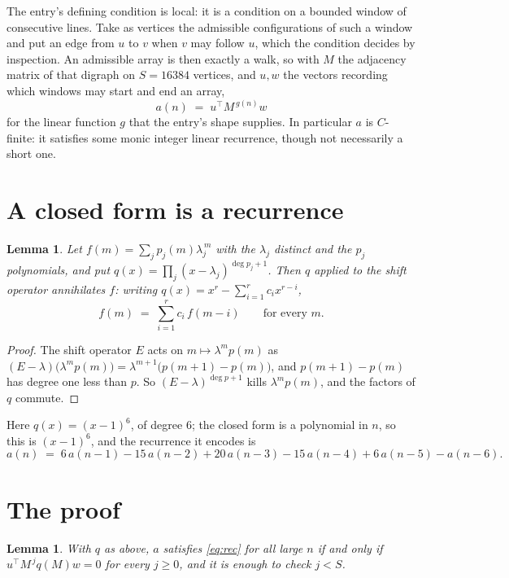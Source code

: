 \documentclass[11pt,a4paper]{article}
\theoremstyle{plain}
\newtheorem{lemma}[theorem]{Lemma}
\theoremstyle{definition}
\begin{document}
The entry's defining condition is local: it is a condition on a bounded window of consecutive lines. Take as vertices the
admissible configurations of such a window and put an edge from $u$ to $v$ when $v$ may
follow $u$, which the condition decides by inspection. An admissible array is then exactly a
walk, so with $M$ the adjacency matrix of that digraph on $S=16384$ vertices, and $u,w$ the
vectors recording which windows may start and end an array,
\[
a(n)\;=\;u^{\!\top}M^{\,g(n)}w
\]
for the linear function $g$ that the entry's shape supplies. In particular $a$ is
$C$-finite: it satisfies some monic integer linear recurrence, though not necessarily a short
one.

\section{A closed form is a recurrence}

\begin{lemma}\label{lem:ann}
Let $f(m)=\sum_{j}p_j(m)\lambda_j^{\,m}$ with the $\lambda_j$ distinct and the $p_j$
polynomials, and put $q(x)=\prod_j(x-\lambda_j)^{\deg p_j+1}$. Then $q$ applied to the shift
operator annihilates $f$: writing $q(x)=x^{r}-\sum_{i=1}^{r}c_ix^{r-i}$,
\[
f(m)\;=\;\sum_{i=1}^{r}c_i\,f(m-i)\qquad\text{for every }m.
\]
\end{lemma}

\begin{proof}
The shift operator $E$ acts on $m\mapsto\lambda^{m}p(m)$ as
$(E-\lambda)\bigl(\lambda^{m}p(m)\bigr)=\lambda^{m+1}\bigl(p(m+1)-p(m)\bigr)$, and
$p(m+1)-p(m)$ has degree one less than $p$. So $(E-\lambda)^{\deg p+1}$ kills
$\lambda^{m}p(m)$, and the factors of $q$ commute.
\end{proof}

Here $q(x)=(x-1)^{6}$, of degree $6$; the closed form is a polynomial in $n$, so this is $(x-1)^{6}$, and the recurrence it encodes is
\begin{equation}\label{eq:rec}
a(n)\;=\;6\,a(n-1) - 15\,a(n-2) + 20\,a(n-3) - 15\,a(n-4) + 6\,a(n-5) - a(n-6).
\end{equation}

\section{The proof}

\begin{lemma}\label{lem:crit}
With $q$ as above, $a$ satisfies \eqref{eq:rec} for all large $n$ if and only if
$u^{\!\top}M^{\,j}q(M)w=0$ for every $j\ge0$, and it is enough to check $j<S$.
\end{lemma}
\end{document}
